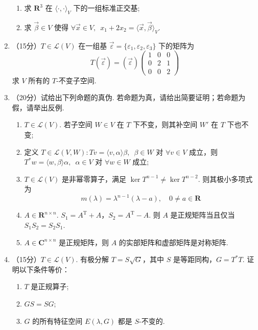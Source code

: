 \begin{enumerate}
\begin{enumerate}
        \item 求 $ \mathbf{R}^3 $ 在 $ \langle \cdot, \cdot \rangle_V $ 下的一组标准正交基;

        \item 求 $ \vec{\beta} \in V $ 使得 $ \forall \vec{x} \in V,\enspace x_1 + 2x_2 = \langle \vec{x}, \vec{\beta} \rangle_V $.
    \end{enumerate}
	\item （15分）$ T \in \mathcal{L}(V) $ 在一组基 $ \vec{\varepsilon} = \{\varepsilon_1, \varepsilon_2, \varepsilon_3\} $ 下的矩阵为
    \[ T(\vec{\varepsilon}) = (\vec{\varepsilon}) \begin{pmatrix} 1 & 0 & 0 \\ 0 & 2 & 1 \\ 0 & 0 & 2 \end{pmatrix} \]
    求 $ V $ 所有的 $ T $-不变子空间.
	\item （20分）试给出下列命题的真伪. 若命题为真，请给出简要证明；若命题为假，请举出反例.
	\begin{enumerate}
        \item $ T \in \mathcal{L}(V) $. 若子空间 $ W \in V $ 在 $ T $ 下不变，则其补空间 $ W' $ 在 $ T $ 下也不变;

        \item 定义 $ T \in \mathcal{L}(V, W) \colon Tv = \langle v, \alpha \rangle \beta,\enspace \beta \in W $ 对 $ \forall v \in V $ 成立，则 $ T^* w = \langle w, \beta \rangle \alpha,\enspace \alpha \in V $ 对 $ \forall w \in W $ 成立;

        \item $ T \in \mathcal{L}(V) $ 是非幂零算子，满足 $ \ker T^{n - 1} \neq \ker T^{n - 2} $. 则其极小多项式为
        \[ m(\lambda) = \lambda^{n-1}(\lambda - a) ,\quad 0 \neq a \in \mathbf{R} \]

        \item $ A \in \mathbf{R}^{n \times n} $. $ S_1 = A^{\mathrm{T}} + A $，$ S_2 = A^{\mathrm{T}} - A $. 则 $ A $ 是正规矩阵当且仅当 $ S_1 S_2 = S_2 S_1 $.

        \item $ A \in \mathbf{C}^{n \times n} $ 是正规矩阵，则 $ A $ 的实部矩阵和虚部矩阵是对称矩阵.
    \end{enumerate}
	\item （15分）$ T \in \mathcal{L}(V) $. 有极分解 $ T = S \sqrt{G} $，其中 $ S $ 是等距同构，$ G = T^* T $. 证明以下条件等价：
    \begin{enumerate}
        \item $ T $ 是正规算子;

        \item $ GS = SG $;

        \item $ G $ 的所有特征空间 $ E(\lambda, G) $ 都是 $ S $-不变的.
    \end{enumerate}
\end{enumerate}

\clearpage

